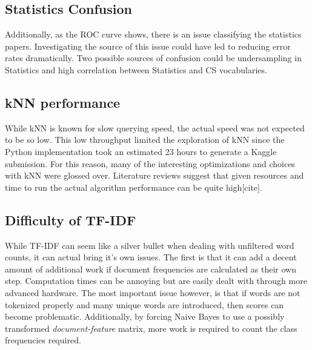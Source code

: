 \documentclass[10pt,twocolumn]{article}
\begin{document}
\subsection*{Statistics Confusion}

Additionally, as the ROC curve shows, there is an issue classifying the statistics papers. Investigating the source of this issue could have led to reducing error rates dramatically. Two possible sources of confusion could be undersampling in Statistics and high correlation between Statistics and CS vocabularies.

\subsection*{kNN performance}

While kNN is known for slow querying speed, the actual speed was not expected to be so low. This low throughput limited the exploration of kNN since the Python implementation took an estimated 23 hours to generate a Kaggle submission. For this reason, many of the interesting optimizations and choices with kNN were glossed over. Literature reviews suggest that given resources and time to run the actual algorithm performance can be quite high[cite].

\subsection*{Difficulty of TF-IDF}

While TF-IDF can seem like a silver bullet when dealing with unfiltered word counts, it can actual bring it's own issues. The first is that it can add a decent amount of additional work if document frequencies are calculated as their own step. Computation times can be annoying but are easily dealt with through more advanced hardware. The most important issue however, is that if words are not tokenized properly and many unique words are introduced, then scores can become problematic. Additionally, by forcing Naive Bayes to use a possibly transformed \emph{document-feature} matrix, more work is required to count the class frequencies required.
\end{document}
